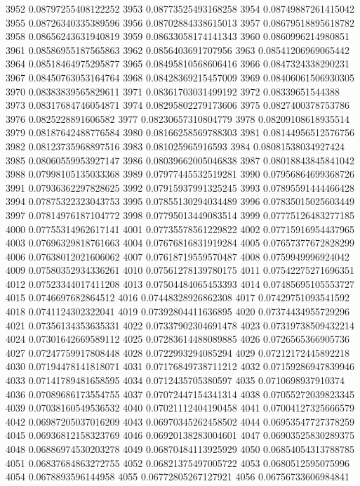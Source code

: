 3952 0.08797255408122252
3953 0.08773525493168258
3954 0.08749887261415042
3955 0.08726340335389596
3956 0.08702884338615013
3957 0.08679518895618782
3958 0.08656243631940819
3959 0.08633058174141343
3960 0.0860996214980851
3961 0.08586955187565863
3962 0.0856403691707956
3963 0.08541206969065442
3964 0.08518464975295877
3965 0.08495810568606416
3966 0.0847324338290231
3967 0.08450763053164764
3968 0.08428369215457009
3969 0.08406061506930305
3970 0.08383839565829611
3971 0.08361703031499192
3972 0.08339651544388
3973 0.08317684746054871
3974 0.08295802279173606
3975 0.0827400378753786
3976 0.0825228891606582
3977 0.08230657310804779
3978 0.08209108618935514
3979 0.08187642488776584
3980 0.08166258569788303
3981 0.08144956512576756
3982 0.08123735968897516
3983 0.081025965916593
3984 0.08081538034927424
3985 0.08060559953927147
3986 0.08039662005046838
3987 0.08018843845841042
3988 0.07998105135033368
3989 0.07977445532519281
3990 0.07956864699368726
3991 0.07936362297828625
3992 0.07915937991325245
3993 0.07895591444466428
3994 0.07875322323043753
3995 0.07855130294034489
3996 0.07835015025603449
3997 0.07814976187104772
3998 0.07795013449083514
3999 0.07775126483277185
4000 0.07755314962617141
4001 0.07735578561229822
4002 0.07715916954437965
4003 0.07696329818761663
4004 0.07676816831919284
4005 0.07657377672828299
4006 0.07638012021606062
4007 0.07618719559570487
4008 0.0759949996924042
4009 0.07580352934336261
4010 0.07561278139780175
4011 0.07542275271696351
4012 0.07523344017411208
4013 0.07504484065453393
4014 0.07485695105553727
4015 0.0746697682864512
4016 0.07448328926862308
4017 0.07429751093541592
4018 0.0741124302322041
4019 0.07392804411636895
4020 0.07374434955729296
4021 0.07356134353635331
4022 0.07337902304691478
4023 0.07319738509432214
4024 0.07301642669589112
4025 0.07283614488089885
4026 0.0726565366905736
4027 0.07247759917808448
4028 0.0722993294085294
4029 0.07212172445892218
4030 0.07194478141818071
4031 0.07176849738711212
4032 0.07159286947839946
4033 0.07141789481658595
4034 0.0712435705380597
4035 0.0710698937910374
4036 0.07089686173554755
4037 0.07072447154341314
4038 0.07055272039823345
4039 0.07038160549536532
4040 0.07021112404190458
4041 0.07004127325666579
4042 0.06987205037016209
4043 0.06970345262458502
4044 0.06953547727378259
4045 0.06936812158323769
4046 0.06920138283004601
4047 0.06903525830289375
4048 0.06886974530203278
4049 0.06870484113925929
4050 0.06854054313788785
4051 0.06837684863272755
4052 0.06821375497005722
4053 0.0680512595075996
4054 0.0678893596144958
4055 0.06772805267127921
4056 0.06756733606984841
